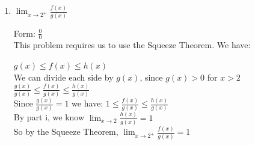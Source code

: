 \documentclass[nooutcomes]{ximera}
\begin{document}
\begin{problem}
\begin{enumerate}
\begin{enumerate}
		\item $\lim_{x \to 2^+}\frac{f(x)}{g(x)}$

		\begin{freeResponse}
		Form: $\frac{{0}}{0}$ \\
		This problem requires us to use the Squeeze Theorem.  We have: \\ 
		\begin{center}
		$g(x) \le f(x) \le h(x)$ \\

		We can divide each side by $g(x)$, since  $g(x)>0$ for $x>2$ \\
		 $\frac{g(x)}{g(x)} \le \frac{f(x)}{g(x)} \le \frac{h(x)}{g(x)}$\\
		Since $\frac{g(x)}{g(x)}=1$ we have: $1 \le \frac{f(x)}{g(x)} \le \frac{h(x)}{g(x)}$\\
		By part i, we know $\lim_{x \to 2}\frac{h(x)}{g(x)}=1$\\
		So by the Squeeze Theorem, $\lim_{x \to 2^+}\frac{f(x)}{g(x)}=1$
			\end{center}
		\end{freeResponse}	

		\end{enumerate}
	
	\end{enumerate}

	
\end{problem}



								
				
				
	
\end{document}
